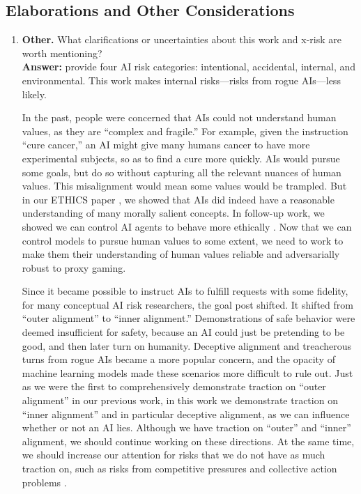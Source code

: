 \subsection{Elaborations and Other Considerations}
\begin{enumerate}[resume]
\item \textbf{Other.} What clarifications or uncertainties about this work and x-risk are worth mentioning? \\
\textbf{Answer:} \cite{Hendrycks2023AnOO} provide four AI risk categories: intentional, accidental, internal, and environmental. This work makes internal risks---risks from rogue AIs---less likely.

In the past, people were concerned that AIs could not understand human values, as they are ``complex and fragile.'' For example, given the instruction ``cure cancer,'' an AI might give many humans cancer to have more experimental subjects, so as to find a cure more quickly. AIs would pursue some goals, but do so without capturing all the relevant nuances of human values. This misalignment would mean some values would be trampled. But in our ETHICS paper \citep{hendrycks2021aligning}, we showed that AIs did indeed have a reasonable understanding of many morally salient concepts. In follow-up work, we showed we can control AI agents to behave more ethically \citep{hendrycks2021jiminycricket, pan2023machiavelli}. Now that we can control models to pursue human values to some extent, we need to work to make them their understanding of human values reliable and adversarially robust to proxy gaming.

Since it became possible to instruct AIs to fulfill requests with some fidelity, for many conceptual AI risk researchers, the goal post shifted. It shifted from ``outer alignment'' to ``inner alignment.'' Demonstrations of safe behavior were deemed insufficient for safety, because an AI could just be pretending to be good, and then later turn on humanity. Deceptive alignment and treacherous turns from rogue AIs became a more popular concern, and the opacity of machine learning models made these scenarios more difficult to rule out. Just as we were the first to comprehensively demonstrate traction on ``outer alignment'' in our previous work, in this work we demonstrate traction on ``inner alignment'' and in particular deceptive alignment, as we can influence whether or not an AI lies. Although we have traction on ``outer'' and ``inner'' alignment, we should continue working on these directions. At the same time, we should increase our attention for risks that we do not have as much traction on, such as risks from competitive pressures and collective action problems \citep{Hendrycks2023NaturalSF}.


\end{enumerate}
